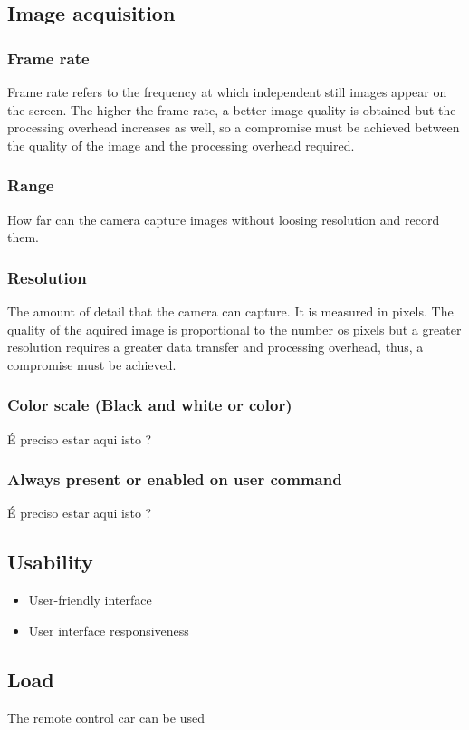 \subsection{Image acquisition}
\label{sec:orgb6a5f66}
\subsubsection{Frame rate}
\label{sec:org5adf4ee}
Frame rate refers to the frequency at which independent still images appear on the screen. The higher the frame rate, a better image quality is obtained but the processing overhead increases as well, so a compromise must be achieved between the quality of the image and the processing overhead required.
\subsubsection{Range}
\label{sec:orgecb044c}
How far can the camera capture images without loosing resolution and record them.
\subsubsection{Resolution}
\label{sec:orgba87554}
The amount of detail that the camera can capture. It is measured in pixels. The quality of the aquired image is proportional to the number os pixels but a greater resolution requires a greater data transfer and processing overhead, thus, a compromise must be achieved.
\subsubsection{Color scale (Black and white or color)}
\label{sec:org468ee04}
É preciso estar aqui isto ?
\subsubsection{Always present or enabled on user command}
\label{sec:orgd585352}
É preciso estar aqui isto ?
\subsection{Usability}
\label{sec:org61632e0}
\begin{itemize}
\item User-friendly interface
\item User interface responsiveness
\end{itemize}
\subsection{Load}
\label{sec:orgca6a690}
The remote control car can be used 
